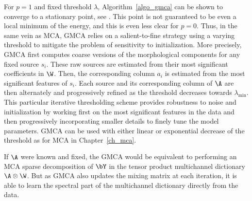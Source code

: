 For $p=1$ and fixed threshold $\lambda$, Algorithm~\ref{algo_gmca} can be shown to converge to a stationary point, see \citet{Tseng01,bobin-gmca-cmb}. This point is not guaranteed to be even a local minimum of the energy, and this is even less clear for $p=0$. Thus, in the same vein as MCA, GMCA relies on a salient-to-fine strategy using a varying threshold to mitigate the problem of sensitivity to initialization. More precisely, GMCA first computes coarse versions of the morphological components for any fixed source $s_i$. These raw sources are estimated from their most significant coefficients in $\W$. Then, the corresponding column $a_i$ is estimated from the most significant features of $s_i$. Each source and its corresponding column of $\A$ are then alternately and progressively refined as the threshold decreases towards $\lambda_{\min}$. This particular iterative thresholding scheme provides robustness to noise and initialization by working first on the most significant features in the data and then progressively incorporating smaller details to finely tune the model parameters. GMCA can be used with either linear or exponential decrease of the threshold as for MCA in Chapter~\ref{ch_mca}.

If $\A$ were known and fixed, the GMCA would be equivalent to performing an MCA sparse decomposition of $\bY$ in the tensor product multichannel dictionary ${\A} \otimes \W$. But as GMCA also updates the mixing matrix at each iteration, it is able to learn the spectral part of the multichannel dictionary directly from the data.



